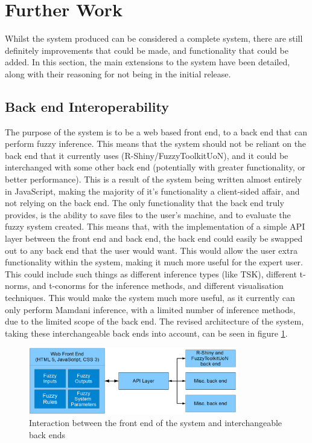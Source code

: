\section{Further Work}
\vspace{-2mm}
Whilst the system produced can be considered a complete system, there are still definitely improvements that could be made, and functionality that could be added. In this section, the main extensions to the system have been detailed, along with their reasoning for not being in the initial release. 

\subsection{Back end Interoperability}
\vspace{-2mm}
\label{sec:bei}
The purpose of the system is to be a web based front end, to a back end that can perform fuzzy inference. This means that the system should not be reliant on the back end that it currently uses (R-Shiny/FuzzyToolkitUoN), and it could be interchanged with some other back end (potentially with greater functionality, or better performance). This is a result of the system being written almost entirely in JavaScript, making the majority of it's functionality a client-sided affair, and not relying on the back end. The only functionality that the back end truly provides, is the ability to save files to the user's machine, and to evaluate the fuzzy system created. This means that, with the implementation of a simple API layer between the front end and back end, the back end could easily be swapped out to any back end that the user would want. This would allow the user extra functionality within the system, making it much more useful for the expert user. This could include such things as different inference types (like TSK), different t-norms, and t-conorms for the inference methods, and different visualisation techniques. This would make the system much more useful, as it currently can only perform Mamdani inference, with a limited number of inference methods, due to the limited scope of the back end. The revised architecture of the system, taking these interchangeable back ends into account, can be seen in figure \ref{fig:fw-interop}.

\begin{figure}[ht!]
	\begin{center}
		\includegraphics[width=0.8125\textwidth]{images/archi-new}
	\end{center}
	\vspace{-4mm}
	\caption{Interaction between the front end of the system and interchangeable back ends}
	\label{fig:fw-interop}
	\vspace{-3mm}
\end{figure}

